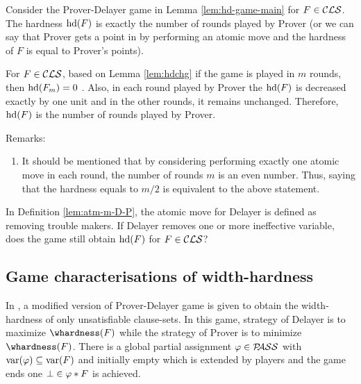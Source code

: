 \documentclass{report}
\begin{document}
\begin{lem}\label{lem:gameres1}
Consider the Prover-Delayer game in Lemma \ref{lem:hd-game-main} for $F \in \mathcal{CLS}$. The hardness $\operatorname{hd}(F)$ is exactly the number of rounds played by Prover (or we can say that Prover gets a point in by performing an atomic move and the hardness of $F$ is equal to Prover's points).
\end{lem}
\begin{prf}
For $F \in \mathcal{CLS}$, based on Lemma \ref{lem:hdchg} if the game is played in $m$ rounds, then $\operatorname{hd}(F_m)=0$ . Also, in each round played by Prover the $\operatorname{hd}(F)$ is decreased exactly by one unit and in the other rounds, it remains unchanged. Therefore, $\operatorname{hd}(F)$ is the number of rounds played by Prover.
\end{prf}
Remarks:
  \begin{enumerate}
  \item It should be mentioned that by considering performing exactly one atomic move in each round, the number of rounds $m$ is an even number. Thus, saying that the hardness equals to $m / 2$ is equivalent to the above statement.
  \end{enumerate}
  
\begin{quest}\label{que:game-move}
In Definition \ref{lem:atm-m-D-P}, the atomic move for Delayer is defined as removing trouble makers. If Delayer removes one or more ineffective variable, does the game still obtain $\operatorname{hd}(F)$ for $F \in \mathcal{CLS}$?
\end{quest}
\subsection{Game characterisations of width-hardness}
\label{sec:game-whdf}

In \cite{BeyersdorffKullmann2014PHP}, a modified version of Prover-Delayer game is given to obtain the width-hardness of only unsatisfiable clause-sets. In this game, strategy of Delayer is to maximize $\whardness(F)$ while the strategy of Prover is to minimize $\whardness(F)$. There is a global partial  assignment $\varphi \in \mathcal{P\hspace{-0.32em}ASS}$ with $\operatorname{var}(\varphi) \subseteq \operatorname{var}(F)$ and initially empty which is extended by players and the game ends one $\bot \in \varphi * F$ is achieved.
\end{document}
